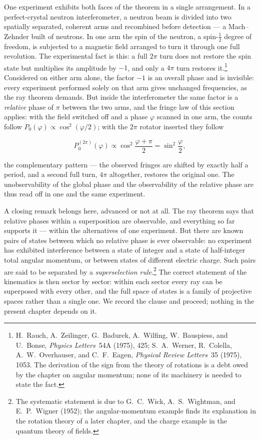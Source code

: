 One experiment exhibits both faces of the theorem in a single arrangement. In a perfect-crystal neutron interferometer, a neutron beam is divided into two spatially separated, coherent arms and recombined before detection --- a Mach--Zehnder built of neutrons. In one arm the spin of the neutron, a spin-$\tfrac12$ degree of freedom, is subjected to a magnetic field arranged to turn it through one full revolution. The experimental fact is this: a full $2\pi$ turn does not restore the spin state but multiplies its amplitude by $-1$, and only a $4\pi$ turn restores it.\footnote{H.~Rauch, A.~Zeilinger, G.~Badurek, A.~Wilfing, W.~Bauspiess, and U.~Bonse, \emph{Physics Letters}~54A (1975), 425; S.~A.~Werner, R.~Colella, A.~W.~Overhauser, and C.~F.~Eagen, \emph{Physical Review Letters}~35 (1975), 1053. The derivation of the sign from the theory of rotations is a debt owed by the chapter on angular momentum; none of its machinery is needed to state the fact.} Considered on either arm alone, the factor $-1$ is an overall phase and is invisible: every experiment performed solely on that arm gives unchanged frequencies, as the ray theorem demands. But inside the interferometer the same factor is a \emph{relative} phase of $\pi$ between the two arms, and the fringe law of this section applies: with the field switched off and a phase $\varphi$ scanned in one arm, the counts follow $P_0(\varphi)\propto\cos^2(\varphi/2)$; with the $2\pi$ rotator inserted they follow
\begin{linenomath}
\begin{equation}
    P_0^{(2\pi)}(\varphi)
    \propto
    \cos^2\frac{\varphi+\pi}{2}
    =
    \sin^2\frac{\varphi}{2},
\end{equation}
\end{linenomath}
the complementary pattern --- the observed fringes are shifted by exactly half a period, and a second full turn, $4\pi$ altogether, restores the original one. The unobservability of the global phase and the observability of the relative phase are thus read off in one and the same experiment.

A closing remark belongs here, advanced or not at all. The ray theorem says that relative phases within a superposition are observable, and everything so far supports it --- within the alternatives of one experiment. But there are known pairs of states between which no relative phase is ever observable: no experiment has exhibited interference between a state of integer and a state of half-integer total angular momentum, or between states of different electric charge. Such pairs are said to be separated by a \emph{superselection rule}.\footnote{The systematic statement is due to G.~C.~Wick, A.~S.~Wightman, and E.~P.~Wigner (1952); the angular-momentum example finds its explanation in the rotation theory of a later chapter, and the charge example in the quantum theory of fields.} The correct statement of the kinematics is then sector by sector: within each sector every ray can be superposed with every other, and the full space of states is a family of projective spaces rather than a single one. We record the clause and proceed; nothing in the present chapter depends on it.

